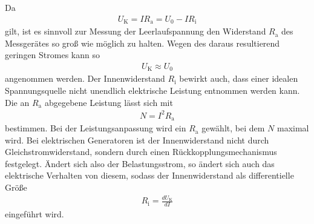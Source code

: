 Da
\begin{align}
U_\text{K} = I R_\text{a} = U_\text{0} - I R_\text{i}
\end{align}
gilt, ist es sinnvoll zur Messung der Leerlaufspannung den Widerstand 
$R_\text{a}$ des Messgerätes so groß wie möglich zu halten. Wegen des
daraus resultierend geringen Stromes kann so
\begin{align*}
U_\text{K} \approx U_\text{0}
\end{align*}
angenommen werden. Der Innenwiderstand $R_\text{i}$ bewirkt auch, dass einer
idealen Spannungsquelle nicht unendlich elektrische Leistung entnommen werden kann.
Die an $R_\text{a}$ abgegebene Leistung lässt sich mit
\begin{align}
N = I^{2} R_\text{a}
\end{align}
bestimmen. Bei der Leistungsanpassung wird ein $R_\text{a}$ gewählt, bei dem $N$
maximal wird. Bei elektrischen Generatoren ist der Innenwiderstand nicht durch 
Gleichstromwiderstand, sondern durch einen Rückkopplungsmechanismus festgelegt.
Ändert sich also der Belastungsstrom, so ändert sich auch das elektrische Verhalten
von diesem, sodass der Innenwiderstand als differentielle Größe
\begin{align*}
R_\text{i} = \frac{dU_\text{K}}{dI}
\end{align*}
eingeführt wird.